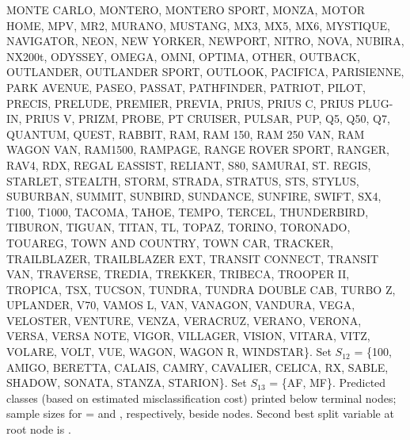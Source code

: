 \documentclass{article}
\begin{document}
\begin{landscape}
 MONTE CARLO, MONTERO, MONTERO SPORT, MONZA, MOTOR HOME, MPV, MR2, MURANO,
 MUSTANG, MX3, MX5, MX6, MYSTIQUE, NAVIGATOR, NEON, NEW YORKER, NEWPORT, NITRO,
 NOVA, NUBIRA, NX200t, ODYSSEY, OMEGA, OMNI, OPTIMA, OTHER, OUTBACK, OUTLANDER,
 OUTLANDER SPORT, OUTLOOK, PACIFICA, PARISIENNE, PARK AVENUE, PASEO, PASSAT,
 PATHFINDER, PATRIOT, PILOT, PRECIS, PRELUDE, PREMIER, PREVIA, PRIUS, PRIUS C,
 PRIUS PLUG-IN, PRIUS V, PRIZM, PROBE, PT CRUISER, PULSAR, PUP, Q5, Q50, Q7,
 QUANTUM, QUEST, RABBIT, RAM, RAM 150, RAM 250 VAN, RAM WAGON VAN, RAM1500,
 RAMPAGE, RANGE ROVER SPORT, RANGER, RAV4, RDX, REGAL EASSIST, RELIANT, S80,
 SAMURAI, ST. REGIS, STARLET, STEALTH, STORM, STRADA, STRATUS, STS, STYLUS,
 SUBURBAN, SUMMIT, SUNBIRD, SUNDANCE, SUNFIRE, SWIFT, SX4, T100, T1000, TACOMA,
 TAHOE, TEMPO, TERCEL, THUNDERBIRD, TIBURON, TIGUAN, TITAN, TL, TOPAZ, TORINO,
 TORONADO, TOUAREG, TOWN AND COUNTRY, TOWN CAR, TRACKER, TRAILBLAZER,
 TRAILBLAZER EXT, TRANSIT CONNECT, TRANSIT VAN, TRAVERSE, TREDIA, TREKKER,
 TRIBECA, TROOPER II, TROPICA, TSX, TUCSON, TUNDRA, TUNDRA DOUBLE CAB, TURBO Z,
 UPLANDER, V70, VAMOS L, VAN, VANAGON, VANDURA, VEGA, VELOSTER, VENTURE, VENZA,
 VERACRUZ, VERANO, VERONA, VERSA, VERSA NOTE, VIGOR, VILLAGER, VISION, VITARA,
 VITZ, VOLARE, VOLT, VUE, WAGON, WAGON R, WINDSTAR\}.
Set $S_{12}$ = \{100, AMIGO, BERETTA, CALAIS, CAMRY, CAVALIER, CELICA, RX,
 SABLE, SHADOW, SONATA, STANZA, STARION\}.
Set $S_{13}$ = \{AF, MF\}.
Predicted classes (based on estimated misclassification cost)
printed below terminal nodes;
 sample sizes for \texttt{} =
 \texttt{} and \texttt{}, respectively, beside nodes.
Second best split variable at root node is \texttt{}.
 \end{landscape}
 
\end{document}
